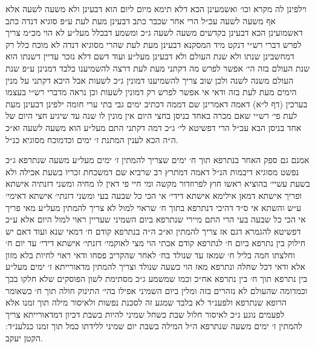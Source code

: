 \documentclass[12pt, openany]{book}
\begin{document}
\begin{multicols}{2}
וילפינן לה מקרא וכו׳ ואשמעינן הכא דלא תימא מיום ליום הוא דבעינן ולא משעה לשעה אלא אף משעה לשעה עכ״ל הרי אחר שכבר כתב דבעינן מעת לעת ע״פ סוגיא דנדה כתב דאשמועינן הכא דבעינן בקדשים משעה לשעה ג״כ ומשמע דבכלל מעל״ע לא הוי מכ״מ צריך לפרש דברי רש״י דנקט מיד המסקנא דבעינן מעת לעת שהרי מסוגיא דנדה לא מוכח כלל רק דמחשבינן שנתו ולא שנת העולם ולא דבעינן מעל״ע ועוד דשם דלא נזכר עדיין דשנתו הוא שנת העולם בזה הי׳ אפשר לפרש מה דקתני מעת לעת דרצה להשמיענו בלבד דמנינן ע״פ שנת העולם משנה לשנה ולכן שוב צריך להשמיענו דמונין ג״כ לשעות אבל היכא דקתני על מנין הימים מעת לעת בזה ודאי אי אפשר לפרש רק דמונין לשעות וכן נראה מדברי רש״י בעצמו בערכין (דף ל״א) דאמה דאמרינן שם דממה דכתיב ימים גבי בתי ערי חומה ילפינן דבעינן מעת לעת פי׳ רש״י שאם מכרה באחד בניסן בחצי היום אין מונין לו שנה עד שיגיע חצי היום של אחד בניסן הבא עכ״ל הרי דפשיטא לי׳ ג״כ דמה דקתני התם מעל״ע הוא משעה לשעה וא״כ ה״ה הכא לענין המתנת ז׳ ימים וכדמוכח מסוגיא כנ״ל.\\\vspace{0pt}

אמנם גם ספק האחר בנתרפא תוך ח׳ ימים שצריך להמתין ז׳ ימים מעל״ע משעה שנתרפא ג״כ נפשט מסוגיא דיבמות הנ״ל דאמה דמתרץ רב שרביא שם דמשכחת זכריו בשעת אכילה ולא בשעת עשיי׳ בהוציא ראשו חוץ לפרוזדור מקשה ומי חיי פי דאין לו מחיה ומשני דזנתיה אישתא ופריך אישתא דמאן אילימא אישתא דידי׳ אי הכי כל שבעה בעי ומשני דזנתי׳ אישתא דאימי׳ ע״ש והשתא אי ס״ד דהיכי דנתרפא בתוך ח׳ שראוי למול לא צריך להמתין מעל״ע מאי פריך אי הכי כל שבעה בעי הרי התם מיירי שנתרפא ביום השמיני שעדיין ראוי למול היום אלא ע״כ דפשיטא להגמרא דגם אז צריך להמתין וא״כ ה״ה בנתרפא קודם ח׳ דמאי שנא ועוד דאם יש חילוק בין נתרפא ביום ח׳ לנתרפא קודם אכתי הוי מצי לאוקמי׳ דזנתי׳ אישתא דידי׳ עד יום ח׳ וחלצתו חמה בליל ח׳ שמאז עד שנולד בח׳ לאחר שהקריב פסחו ודאי ראוי לחיות בלא מזון אלא ודאי דכל שחלה ונתרפא מאז הוי כשעה שנולד וצריך להמתין מדאורייתא ז׳ ימים מעל״ע בין נתרפא תוך ח׳ בין נתרפא אח״כ וכמו שמשמע ג״כ מסתימת לשון הפוסקים שלא חלקו בכך וכמדומה שהעולם לא נזהרים בזה ומלין ביום השמיני אפילו בהי׳ התינוק חולה תוך ח׳ כשאומר הרופא שנתרפא ולפענ״ד לא בלבד שמגע זה לסכנת נפשות ולאיסור מילה תוך זמנו אלא לפעמים נוגע ג״כ לאיסור חלול שבת כשחל שמיני להיות בשבת דכיון דמדאורייתא צריך להמתין ז׳ ימים משעה שנתרפא ה״ל המילה בשבת יום שמיני ללידתו כמל תוך זמנו כנלענ״ד: הקטן יעקב.\\\vspace{0pt}

\end{multicols}\newpage
\end{document}
